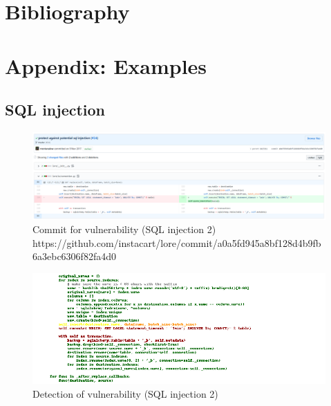 \documentclass[
a4paper,
pagesize,
pdftex,
12pt,
twoside, %
BCOR=5mm, %
ngerman,
fleqn,
final,
]{scrartcl}
\begin{document}
	
	\newpage
	\section{Bibliography}
	
	
	
	
	
	
	\setcounter{secnumdepth}{5} %
	
	
	
	\appendix
	\section*{Appendix: Examples}
	\renewcommand{\thesubsection}{\Alph{subsection}}
	



\subsection{SQL injection}

\begin{figure}[H]
	\centering
	\includegraphics[width=\linewidth]{Images/sqlA}
	\caption{Commit for vulnerability (SQL injection 2) \newline \scriptsize{https://github.com/instacart/lore/commit/a0a5fd945a8bf128d4b9fb6a3ebc6306f82fa4d0}}
	\label{fig:sqlA}
\end{figure}
\begin{figure}[H]
	\centering
	\includegraphics[width=\linewidth]{Images/sqlAr}
	\caption{Detection of vulnerability (SQL injection 2)}
	\label{fig:sqlAr}
\end{figure}
\end{document}
